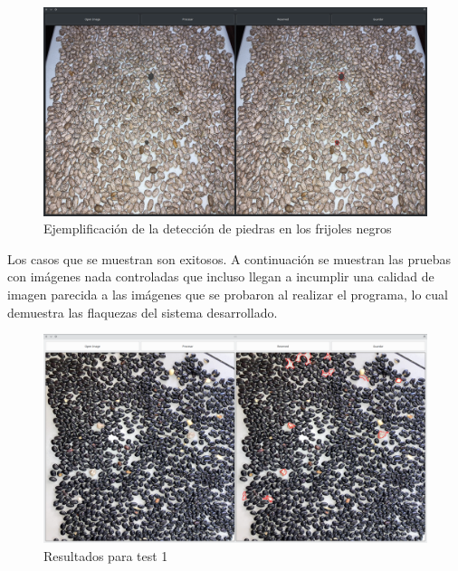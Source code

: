 \documentclass[conference]{IEEEtran}
\begin{document}
    \begin{figure}[H]
        \centering
        \includegraphics[width=\breite\linewidth]{images/negros.png}
        \caption{Ejemplificación de la detección de piedras en los frijoles negros}
        \label{fig:res3}
    \end{figure}

    Los casos que se muestran son exitosos. A continuación se muestran las pruebas con imágenes nada controladas que incluso llegan a incumplir una calidad de imagen parecida a las imágenes que se probaron al realizar el programa, lo cual demuestra las flaquezas del sistema desarrollado.

        \begin{figure}[H]
            \centering
            \includegraphics[width=\breite\linewidth]{images/test1.png}
            \caption{Resultados para test 1}
            \label{fig:test1}
        \end{figure}
\end{document}
